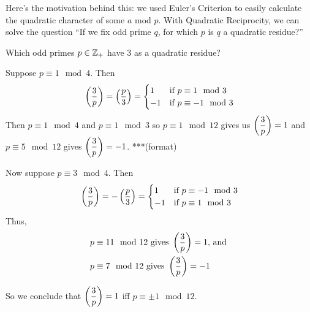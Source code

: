 Here's the motivation behind this: we used Euler's Criterion to easily calculate the quadratic character of some $a$ mod $p$. With Quadratic Reciprocity, we can solve the question ``If we fix odd prime $q$, for which $p$ is $q$ a quadratic residue?''

\begin{example}
    Which odd primes $p\in\mathbb Z_+$ have $3$ as a quadratic residue?

    Suppose $p\equiv 1\mod 4$. Then
    \[\left(\dfrac{3}{p}\right) = \left(\dfrac{p}{3}\right) = \begin{cases}
            1  & \text{if $p\equiv 1\mod 3$}  \\
            -1 & \text{if $p\equiv -1\mod 3$}
        \end{cases}\]
    Then $p\equiv 1\mod 4$ and $p\equiv 1\mod 3$ so $p\equiv 1\mod 12$ gives us $\left(\dfrac{3}{p}\right) = 1$ and $p\equiv 5\mod 12$ gives $\left(\dfrac{3}{p}\right) = -1$. ***(format)

    Now suppose $p\equiv 3\mod 4$. Then
    \[\left(\dfrac{3}{p}\right) = -\left(\dfrac{p}{3}\right) = \begin{cases}
            1  & \text{if $p\equiv -1\mod 3$} \\
            -1 & \text{if $p\equiv 1\mod 3$}
        \end{cases}\]
    Thus,
    \begin{align*}
        p & \equiv 11\mod 12\text{ gives }\left(\dfrac{3}{p}\right) = 1\text{, and } \\
        p & \equiv 7\mod 12\text{ gives }\left(\dfrac{3}{p}\right) = -1
    \end{align*}

    So we conclude that $\left(\dfrac{3}{p}\right) = 1$ iff $p\equiv \pm 1\mod 12$.
\end{example}